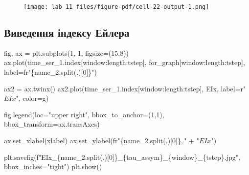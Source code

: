 \documentclass[
  letterpaper,
]{report}
\newenvironment{Shaded}{\begin{snugshade}}{\end{snugshade}}
\newcommand{\DecValTok}[1]{\textcolor[rgb]{0.68,0.00,0.00}{#1}}
\newcommand{\NormalTok}[1]{\textcolor[rgb]{0.00,0.23,0.31}{#1}}
\newcommand{\OperatorTok}[1]{\textcolor[rgb]{0.37,0.37,0.37}{#1}}
\newcommand{\SpecialCharTok}[1]{\textcolor[rgb]{0.37,0.37,0.37}{#1}}
\newcommand{\SpecialStringTok}[1]{\textcolor[rgb]{0.13,0.47,0.30}{#1}}
\newcommand{\StringTok}[1]{\textcolor[rgb]{0.13,0.47,0.30}{#1}}
\newcommand{\VerbatimStringTok}[1]{\textcolor[rgb]{0.13,0.47,0.30}{#1}}
\begin{document}
\begin{figure}[H]

{\centering \texttt{[image: lab\_11\_files/figure-pdf/cell-22-output-1.png]}

}

\end{figure}

\hypertarget{ux432ux438ux432ux435ux434ux435ux43dux43dux44f-ux456ux43dux434ux435ux43aux441ux443-ux435ux439ux43bux435ux440ux430}{%
\subsection{Виведення індексу
Ейлера}\label{ux432ux438ux432ux435ux434ux435ux43dux43dux44f-ux456ux43dux434ux435ux43aux441ux443-ux435ux439ux43bux435ux440ux430}}

\begin{Shaded}
\begin{Highlighting}[]
\NormalTok{fig, ax }\OperatorTok{=}\NormalTok{ plt.subplots(}\DecValTok{1}\NormalTok{, }\DecValTok{1}\NormalTok{, figsize}\OperatorTok{=}\NormalTok{(}\DecValTok{15}\NormalTok{,}\DecValTok{8}\NormalTok{))}
\NormalTok{ax.plot(time\_ser\_1.index[window:length:tstep], for\_graph[window:length:tstep], label}\OperatorTok{=}\VerbatimStringTok{fr"}\SpecialCharTok{\{}\NormalTok{name\_2}\SpecialCharTok{.}\NormalTok{split(}\StringTok{\textquotesingle{}.\textquotesingle{}}\NormalTok{)[}\DecValTok{0}\NormalTok{]}\SpecialCharTok{\}}\VerbatimStringTok{"}\NormalTok{)}

\NormalTok{ax2 }\OperatorTok{=}\NormalTok{ ax.twinx()}
\NormalTok{ax2.plot(time\_ser\_1.index[window:length:tstep], EIx, label}\OperatorTok{=}\VerbatimStringTok{r"$ EIx $"}\NormalTok{, color}\OperatorTok{=}\StringTok{\textquotesingle{}g\textquotesingle{}}\NormalTok{)}

\NormalTok{fig.legend(loc}\OperatorTok{=}\StringTok{"upper right"}\NormalTok{, bbox\_to\_anchor}\OperatorTok{=}\NormalTok{(}\DecValTok{1}\NormalTok{,}\DecValTok{1}\NormalTok{), bbox\_transform}\OperatorTok{=}\NormalTok{ax.transAxes)}

\NormalTok{ax.set\_xlabel(xlabel)}
\NormalTok{ax.set\_ylabel(}\VerbatimStringTok{fr"}\SpecialCharTok{\{}\NormalTok{name\_2}\SpecialCharTok{.}\NormalTok{split(}\StringTok{\textquotesingle{}.\textquotesingle{}}\NormalTok{)[}\DecValTok{0}\NormalTok{]}\SpecialCharTok{\}}\VerbatimStringTok{$,$"} \OperatorTok{+} \StringTok{"$EIx$"}\NormalTok{)}

\NormalTok{plt.savefig(}\SpecialStringTok{f"EIx\_}\SpecialCharTok{\{}\NormalTok{name\_2}\SpecialCharTok{.}\NormalTok{split(}\StringTok{\textquotesingle{}.\textquotesingle{}}\NormalTok{)[}\DecValTok{0}\NormalTok{]}\SpecialCharTok{\}}\SpecialStringTok{\_}\SpecialCharTok{\{}\NormalTok{tau\_assym}\SpecialCharTok{\}}\SpecialStringTok{\_}\SpecialCharTok{\{}\NormalTok{window}\SpecialCharTok{\}}\SpecialStringTok{\_}\SpecialCharTok{\{}\NormalTok{tstep}\SpecialCharTok{\}}\SpecialStringTok{.jpg"}\NormalTok{, bbox\_inches}\OperatorTok{=}\StringTok{"tight"}\NormalTok{)}
\NormalTok{plt.show()}
\end{Highlighting}
\end{Shaded}
\end{document}
